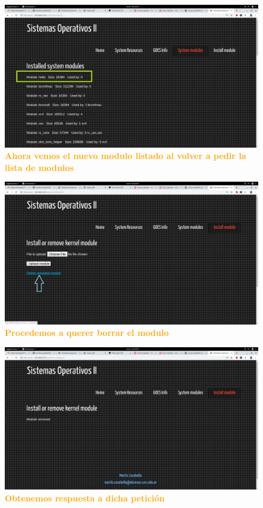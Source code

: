 \documentclass{article}
\begin{document}
\begin{figure}[H]
    \centering
      \includegraphics[width=1.0\textwidth]{figures/14.png}
       \centering
       \caption{\textbf{\textcolor{Orange}{Ahora vemos el nuevo modulo listado al volver a pedir la lista de modulos}}}
         \end{figure}
         
         \begin{figure}[H]
    \centering
      \includegraphics[width=1.0\textwidth]{figures/15.png}
       \centering
       \caption{\textbf{\textcolor{Orange}{Procedemos a querer borrar el modulo}}}
         \end{figure}
         
                  \begin{figure}[H]
    \centering
      \includegraphics[width=1.0\textwidth]{figures/16.png}
       \centering
       \caption{\textbf{\textcolor{Orange}{Obtenemos respuesta a dicha petición}}}
         \end{figure}
         
\end{document}
